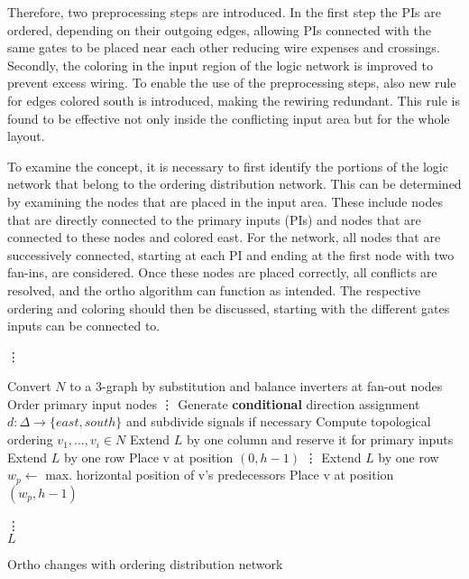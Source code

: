 Therefore, two preprocessing steps are introduced. In the first step the PIs are ordered, depending on their outgoing edges, allowing PIs connected with the same gates to be placed near each other reducing wire expenses and crossings. Secondly, the coloring in the input region of the logic network is improved to prevent excess wiring. To enable the use of the preprocessing steps, also new rule for edges colored south is introduced, making the rewiring redundant. This rule is found to be effective not only inside the conflicting input area but for the whole layout.

To examine the concept, it is necessary to first identify the portions of the logic network that belong to the ordering distribution network. This can be determined by examining the nodes that are placed in the input area. These include nodes that are directly connected to the primary inputs (PIs) and nodes that are connected to these nodes and colored east. For the network, all nodes that are successively connected, starting at each PI and ending at the first node with two fan-ins, are considered. Once these nodes are placed correctly, all conflicts are resolved, and the ortho algorithm can function as intended. The respective ordering and coloring should then be discussed, starting with the different gates inputs can be connected to.

\begin{algorithm}[H]
	\vdots
	
	\begin{algorithmic}
		\State Convert $N$ to a 3-graph by substitution and balance inverters at fan-out nodes
		\State Order primary input nodes
		\State \vdots
		\State Generate \textbf{conditional} direction assignment $d : \Delta \rightarrow \{east, south\}$ and subdivide signals if necessary
		\State Compute topological ordering $v_1, . . . , v_i \in N$
		\State Extend $L$ by one column and reserve it for primary inputs
		\State Extend $L$ by one row
		\State Place v at position $(0, h - 1)$
		\State \vdots
		\State Extend $L$ by one row
		\EndIf
		\State $w_p \leftarrow$ max. horizontal position of v's predecessors
		\State Place v at position $(w _p, h - 1)$
		\EndIf
		
		\EndFor
		\State \vdots \\
		\Return $L$
	\end{algorithmic}
	\caption{Ortho changes with ordering distribution network}\label{alg:input_network}
\end{algorithm}

